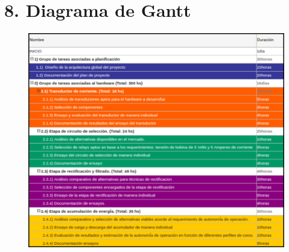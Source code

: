 \documentclass[11pt]{charter}
\begin{document}
\section{8. Diagrama de Gantt}
\label{sec:gantt}
\begin{figure}[H]
	\centering 
	\includegraphics[width=\textwidth]{./Figuras/gantt/inicio-24.png}
	\label{fig:tablegantt1}
\end{figure}
\end{document}
